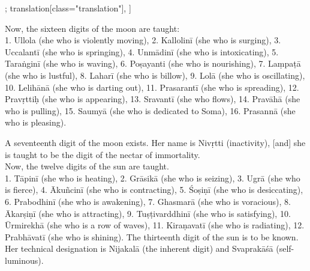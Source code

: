 \begin{alignment}[
  texts=edition[class="edition"];
  translation[class="translation"],
  ]
\begin{translation}
\begin{tlate}
Now, the sixteen digits of the moon are taught:\\

1. Ullola (she who is violently moving), 2. Kallolinī (she who is surging), 3. Uccalantī (she who is springing), 4. Unmādinī (she who is intoxicating), 5. Taraṅginī (she who is waving), 6. Poṣayanti (she who is nourishing), 7. Laṃpaṭā (she who is lustful), 8. Laharī (she who is billow), 9. Lolā (she who is oscillating), 10. Lelihānā (she who is darting out), 11. Prasarantī (she who is spreading), 12. Pravṛttiḥ (she who is appearing), 13. Sravantī (she who flows), 14. Pravāhā (she who is pulling), 15. Saumyā (she who is dedicated to Soma), 16. Prasannā (she who is pleasing).

A seventeenth digit of the moon exists. Her name is Nivṛtti (inactivity), [and] she is taught to be the digit of the nectar of immortality.\\

Now, the twelve digits of the sun are taught.\\

1. Tāpinī (she who is heating), 2. Grāsikā (she who is seizing), 3. Ugrā (she who is fierce), 4. Ākuñcinī (she who is contracting), 5. Śoṣiṇī (she who is desiccating), 6. Prabodhinī (she who is awakening), 7. Ghasmarā (she who is voracious), 8. Ākarṣiṇī (she who is attracting), 9. Tuṣṭivarddhinī (she who is satisfying), 10. Ūrmirekhā (she who is a row of waves), 11. Kiraṇavatī (she who is radiating), 12. Prabhāvatī (she who is shining). The thirteenth digit of the sun is to be known. Her technical designation is Nijakalā (the inherent digit) and Svaprakāśā (self-luminous).
\end{tlate}
  \end{translation}
\end{alignment}
\pagebreak %
